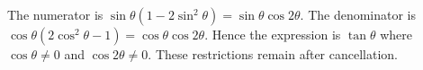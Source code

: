 The numerator is $\sin\theta(1-2\sin^2\theta)=\sin\theta\cos2\theta$. The denominator is $\cos\theta(2\cos^2\theta-1)=\cos\theta\cos2\theta$. Hence the expression is $\boxed{\tan\theta}$ where $\cos\theta\ne0$ and $\cos2\theta\ne0$. These restrictions remain after cancellation.
